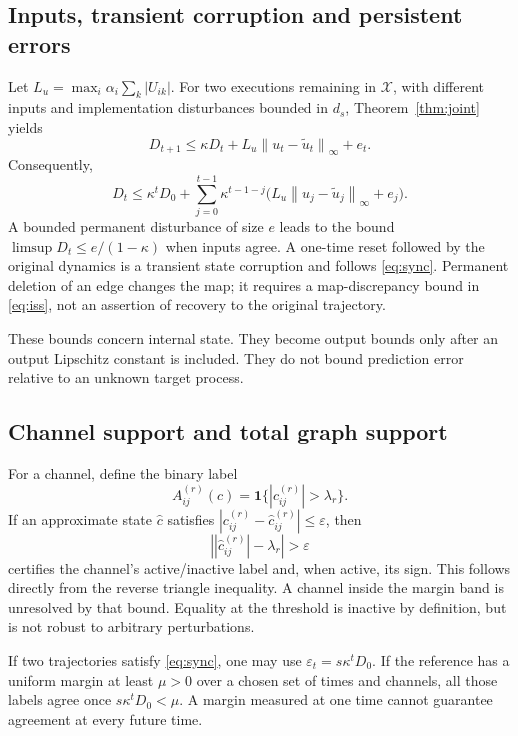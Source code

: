 \documentclass[11pt,a4paper]{article}
\theoremstyle{definition}\newtheorem{definition}[theorem]{Definition}
\newcommand{\norm}[1]{\left\lVert#1\right\rVert}
\newcommand{\state}{\mathcal{X}}
\begin{document}
\subsection{Inputs, transient corruption and persistent errors}
Let $L_u=\max_i\alpha_i\sum_k|U_{ik}|$. For two executions remaining in $\state$, with different inputs and implementation disturbances bounded in $d_s$, Theorem~\ref{thm:joint} yields
\begin{equation}
 D_{t+1}\leq\kappa D_t+L_u\norm{u_t-\widetilde u_t}_\infty+e_t. \label{eq:iss}
\end{equation}
Consequently,
\begin{equation}
 D_t\leq\kappa^tD_0+\sum_{j=0}^{t-1}\kappa^{t-1-j}
 \bigl(L_u\norm{u_j-\widetilde u_j}_\infty+e_j\bigr). \label{eq:isssum}
\end{equation}
A bounded permanent disturbance of size $e$ leads to the bound $\limsup D_t\leq e/(1-\kappa)$ when inputs agree. A one-time reset followed by the original dynamics is a transient state corruption and follows \eqref{eq:sync}. Permanent deletion of an edge changes the map; it requires a map-discrepancy bound in \eqref{eq:iss}, not an assertion of recovery to the original trajectory.

These bounds concern internal state. They become output bounds only after an output Lipschitz constant is included. They do not bound prediction error relative to an unknown target process.

\subsection{Channel support and total graph support}
For a channel, define the binary label
\begin{equation}
 A^{(r)}_{ij}(c)=\mathbf1\{|c^{(r)}_{ij}|>\lambda_r\}.
\end{equation}
If an approximate state $\widehat c$ satisfies $|c^{(r)}_{ij}-\widehat c^{(r)}_{ij}|\leq\varepsilon$, then
\begin{equation}
 \left||\widehat c^{(r)}_{ij}|-\lambda_r\right|>\varepsilon \label{eq:margin}
\end{equation}
certifies the channel's active/inactive label and, when active, its sign. This follows directly from the reverse triangle inequality. A channel inside the margin band is unresolved by that bound. Equality at the threshold is inactive by definition, but is not robust to arbitrary perturbations.

If two trajectories satisfy \eqref{eq:sync}, one may use $\varepsilon_t=s\kappa^tD_0$. If the reference has a uniform margin at least $\mu>0$ over a chosen set of times and channels, all those labels agree once $s\kappa^tD_0<\mu$. A margin measured at one time cannot guarantee agreement at every future time.
\end{document}
